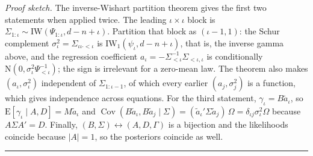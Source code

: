\noindent\textit{Proof sketch.}
The inverse-Wishart partition theorem \citep{gupta2000matrix} gives the first two statements when
applied twice.
The leading $\iota \times \iota$ block is $\Sigma_{1:\iota} \sim \mathrm{IW}(\Psi_{1:\iota}, d - n +
\iota)$.
Partition that block as $(\iota-1, 1)$: the Schur complement $\sigma_\iota^2 = \Sigma_{\iota\iota
\cdot <\iota}$ is $\mathrm{IW}_1(\psi_\iota, d - n + \iota)$, that is, the inverse gamma above, and
the regression coefficient $a_\iota = -\Sigma_{<\iota}^{-1}\Sigma_{<\iota,\iota}$ is conditionally
$\mathrm{N}(0, \sigma_\iota^2 \Psi_{<\iota}^{-1})$; the sign is irrelevant for a zero-mean law.
The theorem also makes $(a_\iota, \sigma_\iota^2)$ independent of $\Sigma_{1:\iota-1}$, of which
every earlier $(a_j, \sigma_j^2)$ is a function, which gives independence across equations.
For the third statement, $\gamma_\iota = B\tilde a_\iota$, so
$\mathrm{E}[\gamma_\iota \mid A, D] = M \tilde a_\iota$ and $\operatorname{Cov}(B\tilde a_\iota,
B\tilde a_j \mid \Sigma) = (\tilde a_\iota' \Sigma \tilde a_j)\,\Omega = \delta_{\iota j}
\sigma_\iota^2 \Omega$ because $A\Sigma A' = D$.
Finally, $(B, \Sigma) \leftrightarrow (A, D, \Gamma)$ is a bijection and the likelihoods coincide
because $|A| = 1$, so the posteriors coincide as well.
\hfill\rule{0.5em}{0.5em}

